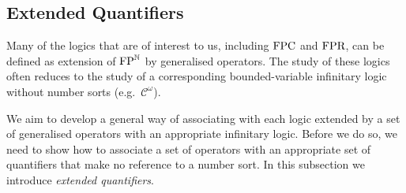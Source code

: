 \documentclass[../main/thesis.tex]{subfiles}
\begin{document}


\subsection{Extended Quantifiers}
Many of the logics that are of interest to us, including $\text{\upshape FPC}$ and $\text{\upshape FPR}$, can
be defined as extension of $\text{\upshape FP}^{\mathbb{N}}$ by generalised operators. The study of
these logics often reduces to the study of a corresponding bounded-variable
infinitary logic without number sorts (e.g.\ $\mathcal{C}^\omega$).

We aim to develop a general way of associating with each logic extended by a set
of generalised operators with an appropriate infinitary logic. Before we do so,
we need to show how to associate a set of operators with an appropriate set of
quantifiers that make no reference to a number sort. In this subsection we
introduce \emph{extended quantifiers}.
\end{document}
